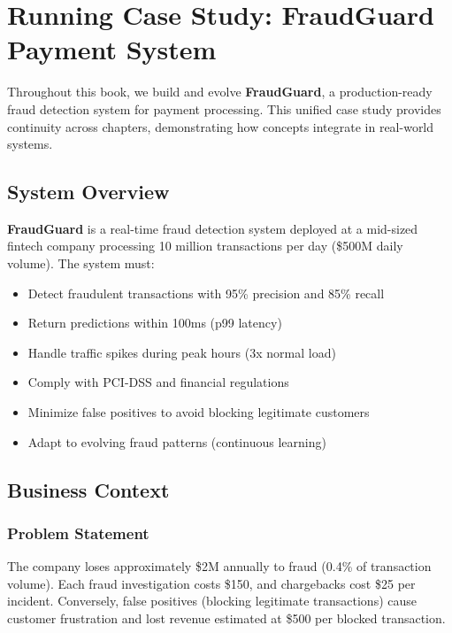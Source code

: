 \chapter{Running Case Study: FraudGuard Payment System}
\label{ch:case_study}

Throughout this book, we build and evolve \textbf{FraudGuard}, a production-ready fraud detection system for payment processing. This unified case study provides continuity across chapters, demonstrating how concepts integrate in real-world systems.

\section{System Overview}

\textbf{FraudGuard} is a real-time fraud detection system deployed at a mid-sized fintech company processing 10 million transactions per day (\$500M daily volume). The system must:

\begin{itemize}
    \item Detect fraudulent transactions with 95\% precision and 85\% recall
    \item Return predictions within 100ms (p99 latency)
    \item Handle traffic spikes during peak hours (3x normal load)
    \item Comply with PCI-DSS and financial regulations
    \item Minimize false positives to avoid blocking legitimate customers
    \item Adapt to evolving fraud patterns (continuous learning)
\end{itemize}

\section{Business Context}

\subsection{Problem Statement}

The company loses approximately \$2M annually to fraud (0.4\% of transaction volume). Each fraud investigation costs \$150, and chargebacks cost \$25 per incident. Conversely, false positives (blocking legitimate transactions) cause customer frustration and lost revenue estimated at \$500 per blocked transaction.

